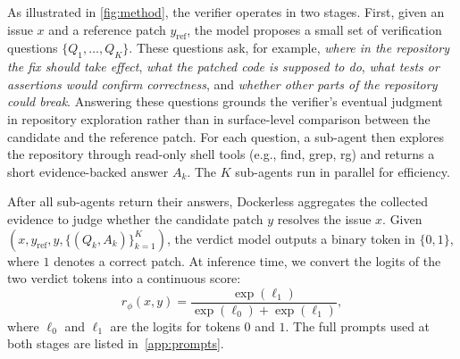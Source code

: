 \documentclass{llmxive}
\providecommand{\approach}{Dockerless\xspace}
\providecommand{\zeng}[1]{\textbf{[Zeng: #1]}}
\providecommand{\gu}[1]{\textbf{[Gu: #1]}}
\begin{document}
As illustrated in \cref{fig:method}, the verifier operates in two stages.
First, given an issue \(x\) and a reference patch \(y_{\text{ref}}\), the model proposes a small set of verification questions $\{Q_1, \dots, Q_K\}$. These questions ask, for example, \textit{where in the repository the fix should take effect}, \textit{what the patched code is supposed to do}, \textit{ what tests or assertions would confirm correctness}, and \textit{whether other parts of the repository could break}.
Answering these questions grounds the verifier's eventual judgment in repository exploration rather than in surface-level comparison between the candidate and the reference patch.
For each question, a sub-agent then explores the repository through read-only shell tools (e.g., find, grep, rg) and returns a short evidence-backed answer $A_k$.
The $K$ sub-agents run in parallel for efficiency.

After all sub-agents return their answers, \approach aggregates the collected evidence to judge whether the candidate patch \(y\) resolves the issue \(x\).
Given \((x, y_{\text{ref}}, y, \{(Q_k, A_k)\}_{k=1}^{K})\), the verdict model outputs a binary token in \(\{0,1\}\), where \(1\) denotes a correct patch.
At inference time, we convert the logits of the two verdict tokens into a continuous score:
\[
  r_\phi(x, y) =
  \frac{\exp(\ell_1)}{\exp(\ell_0) + \exp(\ell_1)},
\]
where \(\ell_0\) and \(\ell_1\) are the logits for tokens \(0\) and \(1\).
The full prompts used at both stages are listed in~\cref{app:prompts}.


\end{document}
